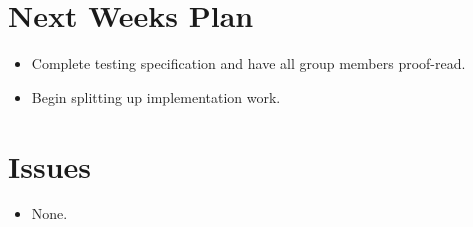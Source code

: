 \section{Next Weeks Plan}
\begin{itemize}
	\item Complete testing specification and have all group
members proof-read.
	\item Begin splitting up implementation work.
\end{itemize}

%
%
%
\section{Issues}
\begin{itemize}
	\item None.
\end{itemize}


